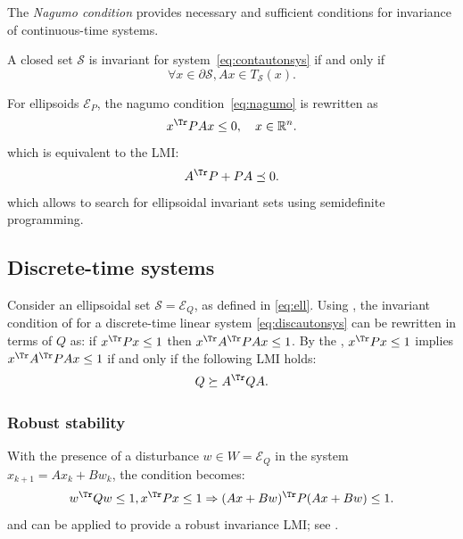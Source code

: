 \documentclass[11pt,twoside,a4paper,openright]{uclouvain-thesis}
\begin{document}
The \emph{Nagumo condition} provides necessary and sufficient conditions
for invariance of continuous-time systems.
\begin{mytheo}
  \label{theo:nagumo}
  A closed set $\mathcal{S}$ is invariant for system~\eqref{eq:contautonsys}
  if and only if
  \begin{equation}
    \label{eq:nagumo}
    \forall x \in \partial \mathcal{S}, Ax \in T_{\mathcal{S}}(x).
  \end{equation}
\end{mytheo}
For ellipsoids $\mathcal{E}_P$, the nagumo condition~\eqref{eq:nagumo} is rewritten as
\[ x^\Tr PAx \leq 0, \quad x \in \mathbb{R}^n. \]
which is equivalent to the LMI:
\begin{equation}
  \label{eq:cont_auton_LMI}
  A^\Tr P + PA \preceq 0.
\end{equation}
which allows to search for ellipsoidal invariant sets using
semidefinite programming.


\subsection{Discrete-time systems}

\label{sec:discsys}

Consider an ellipsoidal set $\mathcal{S} = \mathcal{E}_Q$, as defined in \eqref{eq:ell}.
Using , the invariant condition of  for a discrete-time linear system \eqref{eq:discautonsys}
can be rewritten in terms of $Q$ as:
if $x^\Tr P x \leq 1$ then $x^\Tr A^\Tr P A x \leq 1$.
By the , $x^\Tr P x \leq 1$ implies $x^\Tr A^\Tr P A x \leq 1$ if
and only if the following LMI holds:
\begin{equation}
  \label{eq:disc_auton_LMI}
  Q \succeq A^\Tr Q A.
\end{equation}


\subsubsection{Robust stability}

With the presence of a disturbance $w \in W = \mathcal{E}_Q$ in the system $x_{k+1} = Ax_k + Bw_k$, the condition becomes:
\begin{equation}
  \label{eq:forall}
  w^\Tr Q w \le 1, x^\Tr P x \le 1 \Rightarrow (A x + Bw)^\Tr P (A x + Bw) \le 1.
\end{equation}
and  can be applied to provide a robust invariance LMI; see \cite[(6.5)]{boyd1994linear}.
\end{document}
